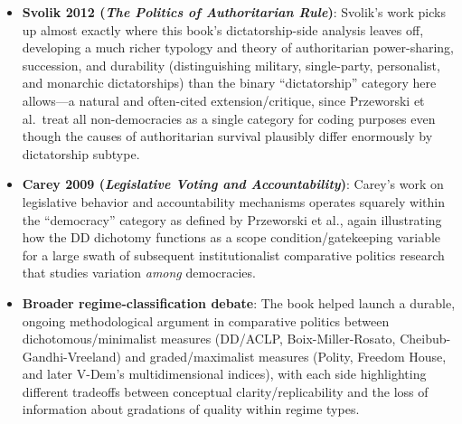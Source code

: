 \documentclass[12pt]{article}
\begin{document}
\begin{itemize}[leftmargin=*, itemsep=4pt]
    \item \textbf{Svolik 2012 (\textit{The Politics of Authoritarian Rule})}: Svolik's work picks up almost exactly where this book's dictatorship-side analysis leaves off, developing a much richer typology and theory of authoritarian power-sharing, succession, and durability (distinguishing military, single-party, personalist, and monarchic dictatorships) than the binary ``dictatorship'' category here allows---a natural and often-cited extension/critique, since Przeworski et al.\ treat all non-democracies as a single category for coding purposes even though the causes of authoritarian survival plausibly differ enormously by dictatorship subtype.
    \item \textbf{Carey 2009 (\textit{Legislative Voting and Accountability})}: Carey's work on legislative behavior and accountability mechanisms operates squarely within the ``democracy'' category as defined by Przeworski et al., again illustrating how the DD dichotomy functions as a scope condition/gatekeeping variable for a large swath of subsequent institutionalist comparative politics research that studies variation \textit{among} democracies.
    \item \textbf{Broader regime-classification debate}: The book helped launch a durable, ongoing methodological argument in comparative politics between dichotomous/minimalist measures (DD/ACLP, Boix-Miller-Rosato, Cheibub-Gandhi-Vreeland) and graded/maximalist measures (Polity, Freedom House, and later V-Dem's multidimensional indices), with each side highlighting different tradeoffs between conceptual clarity/replicability and the loss of information about gradations of quality within regime types.
\end{itemize}
\end{document}
